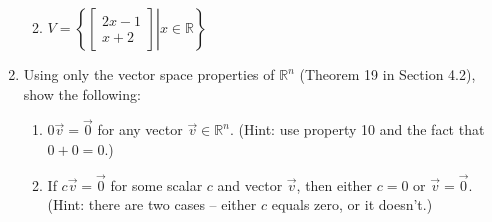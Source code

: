 \documentclass[12pt]{article}
\newcommand{\R}{\mathbb{R}}
\newcommand{\bbm}{\begin{bmatrix}}
\newcommand{\ebm}{\end{bmatrix}}
\begin{document}
\begin{enumerate}
\begin{enumerate}
\vspace{1.5in}

 \item $V=\left\{\left.\bbm 2x-1\\x+2\ebm \right| x\in\R\right\}$

\end{enumerate}

\vspace{1.5in}

\item Using only the vector space properties of $\R^n$ (Theorem 19 in Section 4.2), show the following:
\begin{enumerate}
 \item $0\vec{v} = \vec{0}$ for any vector $\vec{v}\in\R^n$. (Hint: use property 10 and the fact that $0+0=0$.)

\vspace{1.75in}

 \item If $c\vec{v}=\vec{0}$ for some scalar $c$ and vector $\vec{v}$, then either $c=0$ or $\vec{v}=\vec{0}$.\\
(Hint: there are two cases -- either $c$ equals zero, or it doesn't.)
\end{enumerate}

 \end{enumerate}
\end{document}
